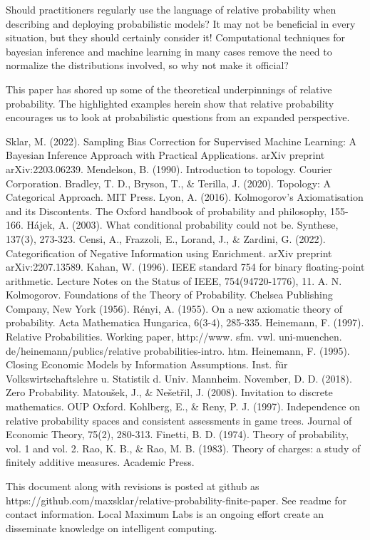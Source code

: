 \documentclass[twoside]{article}
\theoremstyle{plain}%
\theoremstyle{definition}
\theoremstyle{remark}
\begin{document}
Should practitioners regularly use the language of relative probability when describing and deploying probabilistic models? It may not be beneficial in every situation, but they should certainly consider it! Computational techniques for bayesian inference and machine learning in many cases remove the need to normalize the distributions involved, so why not make it official?

This paper has shored up some of the theoretical underpinnings of relative probability. The highlighted examples herein show that relative probability encourages us to look at probabilistic questions from an expanded perspective.

\begin{thebibliography}{20}

Sklar, M. (2022). Sampling Bias Correction for Supervised Machine Learning: A Bayesian Inference Approach with Practical Applications. arXiv preprint arXiv:2203.06239.
Mendelson, B. (1990). Introduction to topology. Courier Corporation.
Bradley, T. D., Bryson, T., \& Terilla, J. (2020). Topology: A Categorical Approach. MIT Press.
Lyon, A. (2016). Kolmogorov’s Axiomatisation and its Discontents. The Oxford handbook of probability and philosophy, 155-166.
Hájek, A. (2003). What conditional probability could not be. Synthese, 137(3), 273-323.
Censi, A., Frazzoli, E., Lorand, J., \& Zardini, G. (2022). Categorification of Negative Information using Enrichment. arXiv preprint arXiv:2207.13589.
Kahan, W. (1996). IEEE standard 754 for binary floating-point arithmetic. Lecture Notes on the Status of IEEE, 754(94720-1776), 11.
A. N. Kolmogorov. Foundations of the Theory of Probability. Chelsea Publishing Company, New York
(1956). 
Rényi, A. (1955). On a new axiomatic theory of probability. Acta Mathematica Hungarica, 6(3-4), 285-335.
Heinemann, F. (1997). Relative Probabilities. Working paper, http://www. sfm. vwl. uni-muenchen. de/heinemann/publics/relative probabilities-intro. htm.
Heinemann, F. (1995). Closing Economic Models by Information Assumptions. Inst. für Volkswirtschaftslehre u. Statistik d. Univ. Mannheim.
November, D. D. (2018). Zero Probability.
Matoušek, J., \& Nešetřil, J. (2008). Invitation to discrete mathematics. OUP Oxford.
Kohlberg, E., \& Reny, P. J. (1997). Independence on relative probability spaces and consistent assessments in game trees. Journal of Economic Theory, 75(2), 280-313.
Finetti, B. D. (1974). Theory of probability, vol. 1 and vol. 2.
Rao, K. B., \& Rao, M. B. (1983). Theory of charges: a study of finitely additive measures. Academic Press.

\end{thebibliography}

This document along with revisions is posted at github as https://github.com/maxsklar/relative-probability-finite-paper. See readme for contact information. Local Maximum Labs is an ongoing effort create an disseminate knowledge on intelligent computing.
\end{document}
